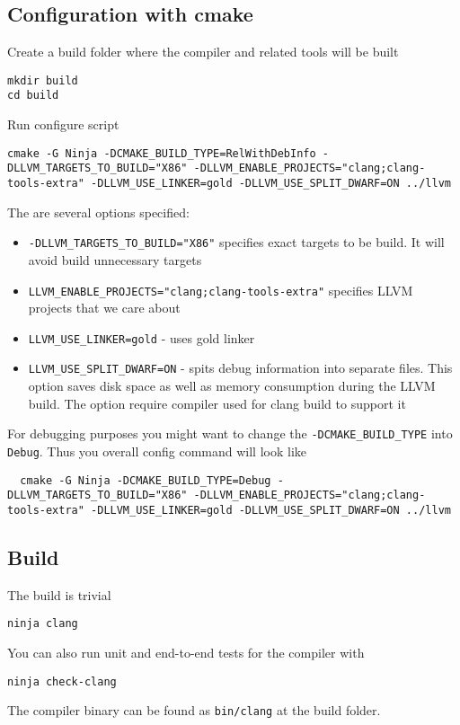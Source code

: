 \subsection{Configuration with cmake}
Create a build folder where the compiler and related tools will be
built
\begin{verbatim}
mkdir build
cd build
\end{verbatim}
Run configure script
\begin{verbatim}
cmake -G Ninja -DCMAKE_BUILD_TYPE=RelWithDebInfo -DLLVM_TARGETS_TO_BUILD="X86" -DLLVM_ENABLE_PROJECTS="clang;clang-tools-extra" -DLLVM_USE_LINKER=gold -DLLVM_USE_SPLIT_DWARF=ON ../llvm
\end{verbatim}
The are several options specified:
\begin{itemize}
  \item \texttt{-DLLVM_TARGETS_TO_BUILD="X86"} specifies exact
    targets to be build. It will avoid build unnecessary targets
  \item \texttt{LLVM_ENABLE_PROJECTS="clang;clang-tools-extra"}
    specifies LLVM projects that we care about
\item \texttt{LLVM_USE_LINKER=gold} - uses gold linker
\item \texttt{LLVM_USE_SPLIT_DWARF=ON} - spits debug information into
  separate files. This option saves disk space as well as memory
  consumption during the LLVM build. The option require compiler used
  for clang build to support it
\end{itemize}
For debugging purposes you might want to change the
\texttt{-DCMAKE_BUILD_TYPE} into
\texttt{Debug}. Thus you overall config command will look
like
\begin{verbatim}
  cmake -G Ninja -DCMAKE_BUILD_TYPE=Debug -DLLVM_TARGETS_TO_BUILD="X86" -DLLVM_ENABLE_PROJECTS="clang;clang-tools-extra" -DLLVM_USE_LINKER=gold -DLLVM_USE_SPLIT_DWARF=ON ../llvm
\end{verbatim}


\subsection{Build}
The build is trivial
\begin{verbatim}
ninja clang
\end{verbatim}
You can also run unit and end-to-end tests for the compiler with
\begin{verbatim}
ninja check-clang
\end{verbatim}
The compiler binary can be found as \texttt{bin/clang} at the build folder. 
